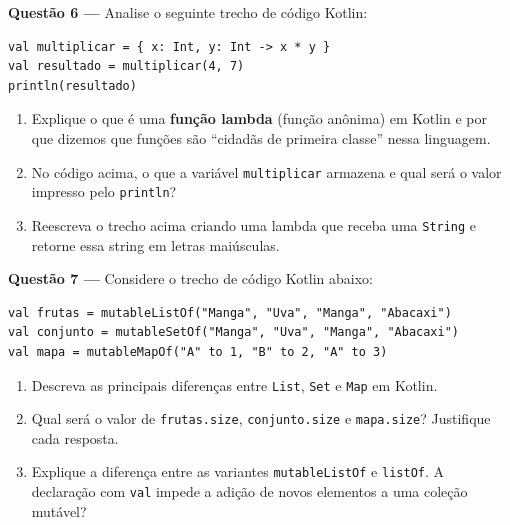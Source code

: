 \documentclass[12pt,a4paper]{article}
\newcommand{\resposta}[1]{
\noindent
\framebox[\textwidth]{
\begin{minipage}{0.98\textwidth}
\vspace*{#1}\null
\end{minipage}
}
}
\begin{document}
\vspace{0.3cm}
\resposta{7cm}

\vspace{0.5cm}

\textbf{Questão 6 —} Analise o seguinte trecho de código Kotlin:

\begin{lstlisting}[basicstyle=\small\ttfamily, breaklines=true]
val multiplicar = { x: Int, y: Int -> x * y }
val resultado = multiplicar(4, 7)
println(resultado)
\end{lstlisting}

\begin{enumerate}[label=\alph*)]
    \item Explique o que é uma \textbf{função lambda} (função anônima) em Kotlin e por que dizemos que funções são ``cidadãs de primeira classe'' nessa linguagem.
    \item No código acima, o que a variável \texttt{multiplicar} armazena e qual será o valor impresso pelo \texttt{println}?
    \item Reescreva o trecho acima criando uma lambda que receba uma \texttt{String} e retorne essa string em letras maiúsculas.
\end{enumerate}

\vspace{0.3cm}
\resposta{7cm}

\vspace{0.5cm}

\textbf{Questão 7 —} Considere o trecho de código Kotlin abaixo:

\begin{lstlisting}[basicstyle=\small\ttfamily, breaklines=true]
val frutas = mutableListOf("Manga", "Uva", "Manga", "Abacaxi")
val conjunto = mutableSetOf("Manga", "Uva", "Manga", "Abacaxi")
val mapa = mutableMapOf("A" to 1, "B" to 2, "A" to 3)
\end{lstlisting}

\begin{enumerate}[label=\alph*)]
    \item Descreva as principais diferenças entre \texttt{List}, \texttt{Set} e \texttt{Map} em Kotlin.
    \item Qual será o valor de \texttt{frutas.size}, \texttt{conjunto.size} e \texttt{mapa.size}? Justifique cada resposta.
    \item Explique a diferença entre as variantes \texttt{mutableListOf} e \texttt{listOf}. A declaração com \texttt{val} impede a adição de novos elementos a uma coleção mutável?
\end{enumerate}
\end{document}
